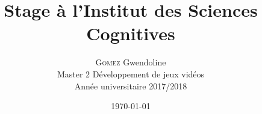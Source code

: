 \begin{titlepage}
\begin{center}

\title{\LARGE{Stage à l'Institut des Sciences Cognitives}}
\author{\textsc{Gomez} Gwendoline \\Master 2 Développement de jeux vidéos \\Année universitaire 2017/2018}
\date{\today}

\end{center}
\end{titlepage}

\ClearShipoutPicture
\newpage